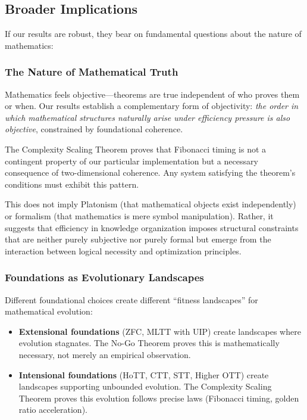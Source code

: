 \documentclass[11pt]{article}
\theoremstyle{definition}
\theoremstyle{remark}
\begin{document}
\subsection{Broader Implications}

If our results are robust, they bear on fundamental questions about the nature of mathematics:

\subsubsection{The Nature of Mathematical Truth}

Mathematics feels objective---theorems are true independent of who proves them or when. Our
results establish a complementary form of objectivity: \emph{the order in which mathematical structures
naturally arise under efficiency pressure is also objective}, constrained by foundational coherence.

The Complexity Scaling Theorem proves that Fibonacci timing is not a contingent property of our
particular implementation but a necessary consequence of two-dimensional coherence. Any system
satisfying the theorem's conditions must exhibit this pattern.

This does not imply Platonism (that mathematical objects exist independently) or formalism (that
mathematics is mere symbol manipulation). Rather, it suggests that efficiency in knowledge organization
imposes structural constraints that are neither purely subjective nor purely formal but emerge from
the interaction between logical necessity and optimization principles.

\subsubsection{Foundations as Evolutionary Landscapes}

Different foundational choices create different ``fitness landscapes'' for mathematical evolution:

\begin{itemize}
\item \textbf{Extensional foundations} (ZFC, MLTT with UIP) create landscapes where evolution
stagnates. The No-Go Theorem proves this is mathematically necessary, not merely an empirical
observation.

\item \textbf{Intensional foundations} (HoTT, CTT, STT, Higher OTT) create landscapes supporting
unbounded evolution. The Complexity Scaling Theorem proves this evolution follows precise laws
(Fibonacci timing, golden ratio acceleration).
\end{itemize}
\end{document}
